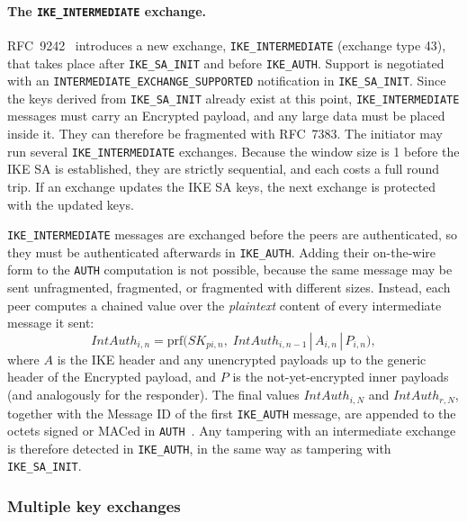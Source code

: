 \paragraph{The \texttt{IKE\_INTERMEDIATE} exchange.}
RFC~9242~\cite{rfc9242} introduces a new exchange, \texttt{IKE\_INTERMEDIATE}
(exchange type 43), that takes place after \texttt{IKE\_SA\_INIT} and before
\texttt{IKE\_AUTH}. Support is negotiated with an
\texttt{INTERMEDIATE\_EXCHANGE\_SUPPORTED} notification in
\texttt{IKE\_SA\_INIT}. Since the keys derived from \texttt{IKE\_SA\_INIT}
already exist at this point, \texttt{IKE\_INTERMEDIATE} messages must carry an
Encrypted payload, and any large data must be placed inside it. They can
therefore be fragmented with RFC~7383. The initiator may run several
\texttt{IKE\_INTERMEDIATE} exchanges. Because the window size is 1 before the
IKE SA is established, they are strictly sequential, and each costs a full
round trip. If an exchange updates the IKE SA keys, the next exchange is
protected with the updated keys.

\texttt{IKE\_INTERMEDIATE} messages are exchanged before the peers are
authenticated, so they must be authenticated afterwards in
\texttt{IKE\_AUTH}. Adding their on-the-wire form to the \texttt{AUTH}
computation is not possible, because the same message may be sent
unfragmented, fragmented, or fragmented with different sizes. Instead, each
peer computes a chained value over the \emph{plaintext} content of every
intermediate message it sent:
\begin{equation}
    \mathit{IntAuth}_{i,n} = \mathrm{prf}\bigl(SK_{pi,n},\; \mathit{IntAuth}_{i,n-1} \,|\, A_{i,n} \,|\, P_{i,n}\bigr),
\end{equation}
where $A$ is the IKE header and any unencrypted payloads up to the generic
header of the Encrypted payload, and $P$ is the not-yet-encrypted inner
payloads (and analogously for the responder). The final values
$\mathit{IntAuth}_{i,N}$ and $\mathit{IntAuth}_{r,N}$, together with the
Message ID of the first \texttt{IKE\_AUTH} message, are appended to the octets
signed or MACed in \texttt{AUTH}~\cite{rfc9242}. Any tampering with an
intermediate exchange is therefore detected in \texttt{IKE\_AUTH}, in the same
way as tampering with \texttt{IKE\_SA\_INIT}.

\subsubsection{Multiple key exchanges}
\label{sec:sota-multike}

